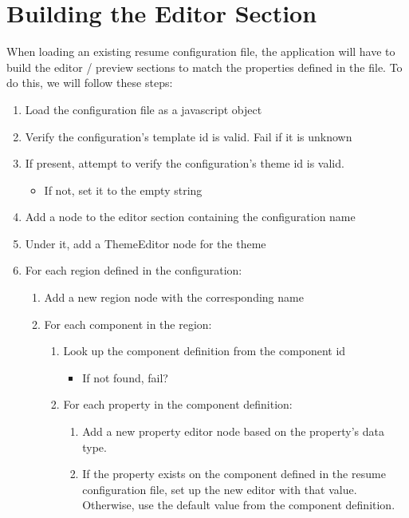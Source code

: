 \documentclass[12pt]{article}
\begin{document}
    \section{Building the Editor Section}
    \label{sec:building-the-editor}
    When loading an existing resume configuration file, the application will have to build the editor / 
    preview sections to match the properties defined in the file. To do this, we will follow these steps:
    \begin{enumerate}
        \item Load the configuration file as a javascript object 
        \item Verify the configuration's template id is valid. Fail if it is unknown
        \item If present, attempt to verify the configuration's theme id is valid. 
        \begin{itemize}
            \item If not, set it to the empty string
        \end{itemize}
        \item Add a node to the editor section containing the configuration name 
        \item Under it, add a ThemeEditor node for the theme 
        \item For each region defined in the configuration:
        \begin{enumerate}
            \item Add a new region node with the corresponding name 
            \item For each component in the region:
            \begin{enumerate}
                \item Look up the component definition from the component id 
                \begin{itemize}
                    \item If not found, fail?
                \end{itemize}
                \item For each property in the component definition:
                \begin{enumerate}
                    \item Add a new property editor node based on the property's data type.
                    \item If the property exists on the component defined in the resume 
                    configuration file, set up the new editor with that value. Otherwise, 
                    use the default value from the component definition.
                \end{enumerate}
            \end{enumerate}
        \end{enumerate}
    \end{enumerate}   
    
\end{document}
